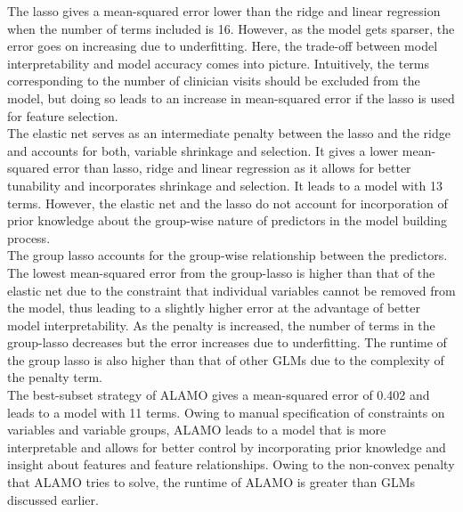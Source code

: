 \documentclass[a4paper,12pt]{article}
\begin{document}
\noindent The lasso gives a mean-squared error lower than the ridge and linear regression when the number of terms included is 16. However, as the model gets sparser, the error goes on increasing due to underfitting. Here, the trade-off between model interpretability and model accuracy comes into picture. Intuitively, the terms corresponding to the number of clinician visits should be excluded from the model, but doing so leads to an increase in mean-squared error if the lasso is used for feature selection. \\

\noindent The elastic net serves as an intermediate penalty between the lasso and the ridge and accounts for both, variable shrinkage and selection. It gives a lower mean-squared error than lasso, ridge and linear regression as it allows for better tunability and incorporates shrinkage and selection. It leads to a model with 13 terms. However, the elastic net and the lasso do not account for incorporation of prior knowledge about the group-wise nature of predictors in the model building process. \\

\noindent The group lasso accounts for the group-wise relationship between the predictors. The lowest mean-squared error from the group-lasso is higher than that of the elastic net due to the constraint that individual variables cannot be removed from the model, thus leading to a slightly higher error at the advantage of better model interpretability. As the penalty is increased, the number of terms in the group-lasso decreases but the error increases due to underfitting. The runtime of the group lasso is also higher than that of other GLMs due to the complexity of the penalty term.\\

\noindent The best-subset strategy of ALAMO gives a mean-squared error of 0.402 and leads to a model with 11 terms. Owing to manual specification of constraints on variables and variable groups, ALAMO leads to a model that is more interpretable and allows for better control by incorporating prior knowledge and insight about features and feature relationships. Owing to the non-convex penalty that ALAMO tries to solve, the runtime of ALAMO is greater than GLMs discussed earlier. \\
\end{document}

